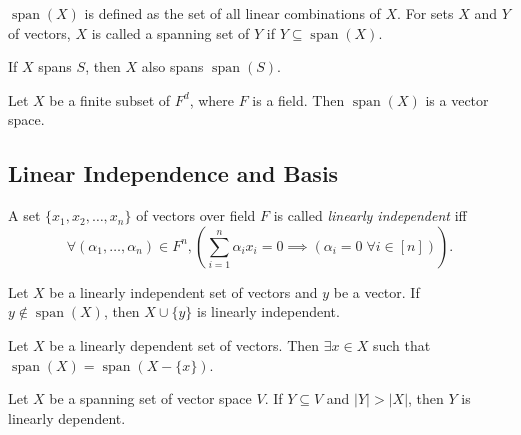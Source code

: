 \documentclass[a4paper,12pt,fleqn]{article}
\DeclareMathOperator{\Span}{span}
\begin{document}
\begin{definition}[Span]
$\Span(X)$ is defined as the set of all linear combinations of $X$.
For sets $X$ and $Y$ of vectors, $X$ is called a spanning set of $Y$ if $Y \subseteq \Span(X)$.
\end{definition}

\begin{lemma}
If $X$ spans $S$, then $X$ also spans $\Span(S)$.
\end{lemma}

\begin{theorem}[DWAP]
Let $X$ be a finite subset of $F^d$, where $F$ is a field. Then $\Span(X)$ is a vector space.
\end{theorem}

\subsection{Linear Independence and Basis}

\begin{definition}
A set $\{x_1, x_2, \ldots, x_n\}$ of vectors over field $F$
is called \emph{linearly independent} iff
\[ \forall (\alpha_1, \ldots, \alpha_n) \in F^n,
\left( \sum_{i=1}^n \alpha_i x_i = 0 \implies (\alpha_i = 0 \;\forall i \in [n])\right). \]
\end{definition}

\begin{lemma}
\label{thm:vecsp:inc-linindep}
Let $X$ be a linearly independent set of vectors and $y$ be a vector.
If $y \not\in \Span(X)$, then $X \cup \{y\}$ is linearly independent.
\end{lemma}

\begin{lemma}
\label{thm:vecsp:dec-lindep}
Let $X$ be a linearly dependent set of vectors.
Then $\exists x \in X$ such that $\Span(X) = \Span(X - \{x\})$.
\end{lemma}

\begin{theorem}[DWAP]
\label{thm:vecsp:larger-than-span-is-dep}
Let $X$ be a spanning set of vector space $V$.
If $Y \subseteq V$ and $|Y| > |X|$, then $Y$ is linearly dependent.
\end{theorem}
\end{document}
